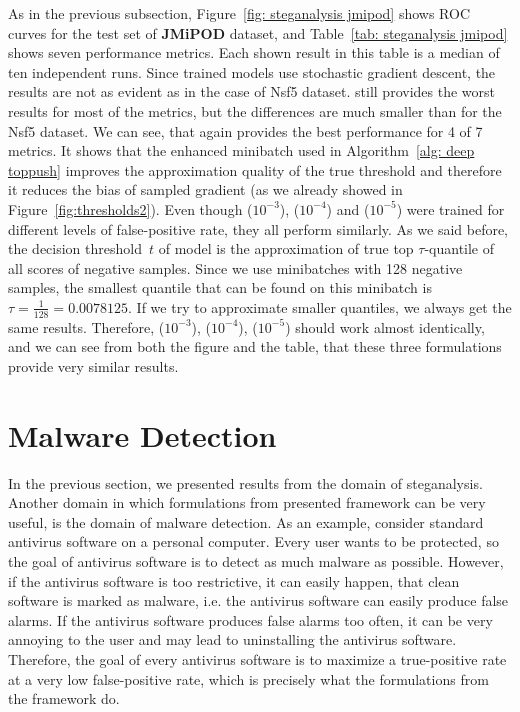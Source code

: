 As in the previous subsection, Figure~\ref{fig: steganalysis jmipod} shows ROC curves for the test set of \textbf{JMiPOD} dataset, and Table~\ref{tab: steganalysis jmipod} shows seven performance metrics. Each shown result in this table is a median of ten independent runs. Since trained models use stochastic gradient descent, the results are not as evident as in the case of Nsf5 dataset. \BaseLine still provides the worst results for most of the metrics, but the differences are much smaller than for the Nsf5 dataset. We can see, that \DeepTopPush again provides the best performance for 4 of 7 metrics. It shows that the enhanced minibatch used in \DeepTopPush Algorithm~\ref{alg: deep toppush} improves the approximation quality of the true threshold and therefore it reduces the bias of sampled gradient (as we already showed in Figure~\ref{fig:thresholds2}). Even though \PatMatNP($10^{-3}$), \PatMatNP($10^{-4}$) and \PatMatNP($10^{-5}$) were trained for different levels of false-positive rate, they all perform similarly. As we said before, the decision threshold~$t$ of \PatMatNP model is the approximation of true top $\tau$-quantile of all scores of negative samples. Since we use minibatches with 128 negative samples, the smallest quantile that can be found on this minibatch is~$\tau = \frac{1}{128}=0.0078125.$ If we try to approximate smaller quantiles, we always get the same results. Therefore, \PatMatNP($10^{-3}$), \PatMatNP($10^{-4}$), \PatMatNP($10^{-5}$) should work almost identically, and we can see from both the figure and the table, that these three formulations provide very similar results.

\section{Malware Detection}

In the previous section, we presented results from the domain of steganalysis. Another domain in which formulations from presented framework can be very useful, is the domain of malware detection. As an example, consider standard antivirus software on a personal computer. Every user wants to be protected, so the goal of antivirus software is to detect as much malware as possible. However, if the antivirus software is too restrictive, it can easily happen, that clean software is marked as malware, i.e. the antivirus software can easily produce false alarms. If the antivirus software produces false alarms too often, it can be very annoying to the user and may lead to uninstalling the antivirus software. Therefore, the goal of every antivirus software is to maximize a true-positive rate at a very low false-positive rate, which is precisely what the formulations from the framework do.

